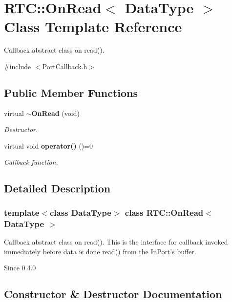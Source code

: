 \section{RTC::OnRead$<$ DataType $>$ Class Template Reference}
\label{structRTC_1_1OnRead}


Callback abstract class on read().  




{\ttfamily \#include $<$PortCallback.h$>$}

\subsection*{Public Member Functions}
\begin{DoxyCompactItemize}
\item 
virtual {\bf $\sim$OnRead} (void)
\begin{DoxyCompactList}\small\item\em Destructor. \item\end{DoxyCompactList}\item 
virtual void {\bf operator()} ()=0
\begin{DoxyCompactList}\small\item\em Callback function. \item\end{DoxyCompactList}\end{DoxyCompactItemize}


\subsection{Detailed Description}
\subsubsection*{template$<$class DataType$>$ class RTC::OnRead$<$ DataType $>$}

Callback abstract class on read(). This is the interface for callback invoked immediately before data is done read() from the InPort's buffer.

\begin{DoxySince}{Since}
0.4.0 
\end{DoxySince}


\subsection{Constructor \& Destructor Documentation}
